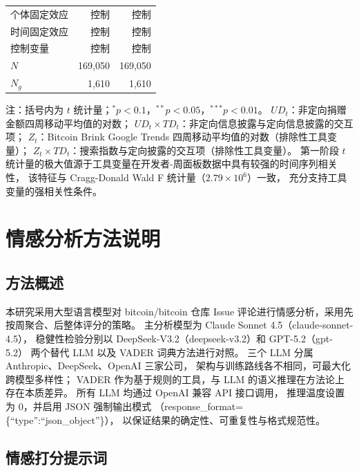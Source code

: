\documentclass[
    type = master, %
    degree = professional,        %
    decl-page,  %
    twoside,                %
    fontset = fandol %
  ]{njuthesis}
\renewcommand{\footnotesize}{\zihao{-5}}
\begin{document}
\begin{table}[htbp]
\begin{tabularx}{\textwidth}{Xrr}
        个体固定效应 & 控制 & 控制 \\
        时间固定效应 & 控制 & 控制 \\
        控制变量  & 控制 & 控制 \\
        $N$         & 169,050 & 169,050 \\
        $N_g$       & 1,610   & 1,610 \\
        \bottomrule
    \end{tabularx}
    \begin{minipage}{\textwidth}
        \vspace{0.3em}
        \footnotesize 注：括号内为 $t$ 统计量；$^{*}p<0.1$，$^{**}p<0.05$，$^{***}p<0.01$。
        $\mathit{UD}_t$：非定向捐赠金额四周移动平均值的对数；
        $\mathit{UD}_t \times \mathit{TD}_t$：非定向信息披露与定向信息披露的交互项；
        $Z_t$：Bitcoin Brink Google Trends 四周移动平均值的对数（排除性工具变量）；
        $Z_t \times \mathit{TD}_t$：搜索指数与定向披露的交互项（排除性工具变量）。
        第一阶段 $t$ 统计量的极大值源于工具变量在开发者-周面板数据中具有较强的时间序列相关性，
        该特征与 Cragg-Donald Wald F 统计量（$2.79 \times 10^6$）一致，
        充分支持工具变量的强相关性条件。
    \end{minipage}
\end{table}

\chapter{情感分析方法说明}

\section{方法概述}

本研究采用大型语言模型对 bitcoin/bitcoin 仓库 Issue 评论进行情感分析，采用先按周聚合、后整体评分的策略。
主分析模型为 Claude Sonnet 4.5（claude-sonnet-4.5），
稳健性检验分别以 DeepSeek-V3.2（deepseek-v3.2）和 GPT-5.2（gpt-5.2）
两个替代 LLM 以及 VADER 词典方法进行对照。
三个 LLM 分属 Anthropic、DeepSeek、OpenAI 三家公司，
架构与训练路线各不相同，可最大化跨模型多样性；
VADER 作为基于规则的工具，与 LLM 的语义推理在方法论上存在本质差异。
所有 LLM 均通过 OpenAI 兼容 API 接口调用，
推理温度设置为 0，并启用 JSON 强制输出模式
（response\_format=\{“type”:“json\_object”\}），
以保证结果的确定性、可重复性与格式规范性。

\section{情感打分提示词}
\end{document}
